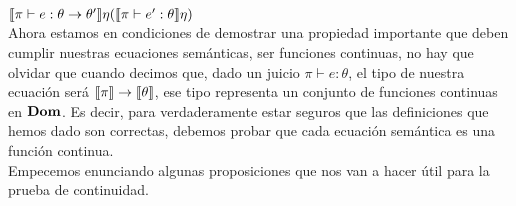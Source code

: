 $\llbracket \pi \vdash e : \theta \rightarrow \theta' \rrbracket\eta
									(\llbracket \pi \vdash e' : \theta \rrbracket \eta)$\\

Ahora estamos en condiciones de demostrar una propiedad importante que deben cumplir nuestras 
ecuaciones sem\'anticas, ser funciones continuas, no hay que olvidar
que cuando decimos que, dado un juicio $\pi \vdash e : \theta$, el tipo
de nuestra ecuaci\'on ser\'a $\llbracket \pi \rrbracket \rightarrow \llbracket \theta \rrbracket$, ese 
tipo representa un conjunto de funciones continuas en $\textbf{Dom}$. Es decir, para
verdaderamente estar seguros que las definiciones que hemos dado son 
correctas, debemos probar que cada ecuaci\'on sem\'antica es una funci\'on
continua.\\

Empecemos enunciando algunas proposiciones que nos van a hacer \'util para
la prueba de continuidad.

